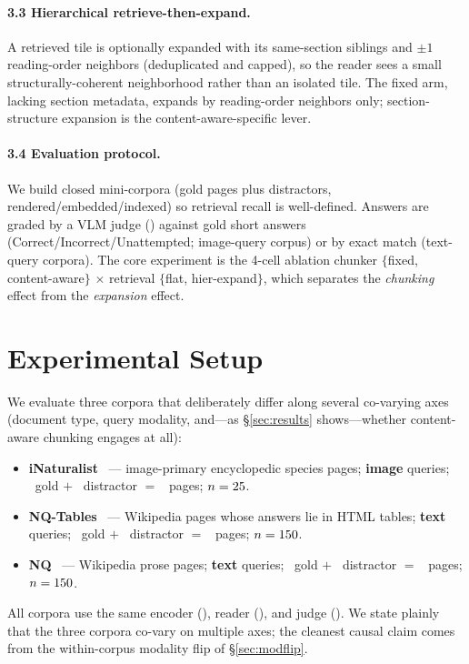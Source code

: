 \documentclass[11pt]{article}
\begin{document}
\paragraph{3.3 Hierarchical retrieve-then-expand.} A retrieved tile is optionally expanded with its
same-section siblings and $\pm1$ reading-order neighbors (deduplicated and capped), so the reader sees a
small structurally-coherent neighborhood rather than an isolated tile. The fixed arm, lacking section
metadata, expands by reading-order neighbors only; section-structure expansion is the
content-aware-specific lever.

\paragraph{3.4 Evaluation protocol.} We build closed mini-corpora (gold pages plus distractors,
rendered\slash embedded\slash indexed) so retrieval recall is well-defined. Answers are graded by a VLM judge
(\texttt{\JudgeModel}) against gold short answers (Correct\slash Incorrect\slash Unattempted; image-query corpus) or
by exact match (text-query corpora). The core experiment is the 4-cell ablation chunker
$\{$fixed, content-aware$\}$ $\times$ retrieval $\{$flat, hier-expand$\}$, which separates the
\emph{chunking} effect from the \emph{expansion} effect.

\section{Experimental Setup}\label{sec:setup}
We evaluate three corpora that deliberately differ along several co-varying axes (document type, query
modality, and---as \S\ref{sec:results} shows---whether content-aware chunking engages at all):
\begin{itemize}\setlength\itemsep{1pt}
  \item \textbf{iNaturalist}~\citep{evqa} --- image-primary encyclopedic species pages; \textbf{image}
        queries; \InatGold\ gold $+$ \InatDistr\ distractor $=$ \InatPages\ pages; $n=25$.
  \item \textbf{NQ-Tables}~\citep{nq} --- Wikipedia pages whose answers lie in HTML tables; \textbf{text}
        queries; \NqtGold\ gold $+$ \NqtDistr\ distractor $=$ \NqtPages\ pages; $n=150$.
  \item \textbf{NQ}~\citep{nq} --- Wikipedia prose pages; \textbf{text} queries; \NqGold\ gold $+$
        \NqDistr\ distractor $=$ \NqPages\ pages; $n=150$.
\end{itemize}
All corpora use the same encoder (\EmbedModel), reader (\texttt{\ReaderModel}), and judge
(\texttt{\JudgeModel}). We state plainly that the three corpora co-vary on multiple axes; the cleanest
causal claim comes from the within-corpus modality flip of \S\ref{sec:modflip}.
\end{document}
